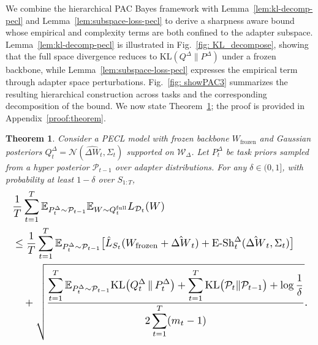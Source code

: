 \documentclass{article}
\theoremstyle{plain}
\newtheorem{theorem}{Theorem}[section]
\theoremstyle{definition}
\theoremstyle{remark}
\begin{document}



We combine the hierarchical PAC Bayes framework with Lemma~\ref{lem:kl-decomp-pecl} and Lemma~\ref{lem:subspace-loss-pecl} to derive a sharpness aware bound whose empirical and complexity terms are both confined to the adapter subspace.
Lemma~\ref{lem:kl-decomp-pecl} is illustrated in Fig.~\ref{fig: KL_decompose}, showing that the full space divergence reduces to $\mathrm{KL}(Q^{\Delta}\|P^{\Delta})$ under a frozen backbone, while Lemma~\ref{lem:subspace-loss-pecl} expresses the empirical term through adapter space perturbations.
Fig.~\ref{fig: showPAC3} summarizes the resulting hierarchical construction across tasks and the corresponding decomposition of the bound.
We now state Theorem~\ref{thm:pecl-bound}; the proof is provided in Appendix~\ref{proof:theorem}.


\begin{theorem}
\label{thm:pecl-bound}
Consider a PECL model with frozen backbone $W_{\mathrm{frozen}}$ and Gaussian posteriors 
$Q_t^\Delta = \mathcal N(\hat{\Delta W}_t,\Sigma_t)$ supported on $\mathcal W_\Delta$. 
Let $P_t^\Delta$ be task priors sampled from a hyper posterior $\mathcal P_{t-1}$ over adapter 
distributions. For any $\delta\in(0,1]$, with probability at least $1-\delta$ over $S_{1:T}$,
\begin{equation}
\label{eq:pecl-main-bound}
\resizebox{\linewidth}{!}{$
\begin{aligned}
&\frac{1}{T}\sum_{t=1}^T
\mathbb E_{P_t^\Delta\sim\mathcal P_{t-1}}
\mathbb E_{W\sim Q_t^{\mathrm{full}}}
L_{\mathcal D_t}(W) \\
&\le
\frac{1}{T}\sum_{t=1}^T
\mathbb E_{P_t^\Delta\sim\mathcal P_{t-1}}
\bigl[
\hat L_{S_t}(W_{\mathrm{frozen}} + \hat{\Delta W}_t)
+
\mathrm{E\text{-}Sh}_t^\Delta(\hat{\Delta W}_t,\Sigma_t)
\bigr] \\
&\quad+
\sqrt{
\frac{
\displaystyle
\sum_{t=1}^T
\mathbb E_{P_t^\Delta\sim\mathcal P_{t-1}}
\mathrm{KL}\bigl(Q_t^\Delta \,\Vert\, P_t^\Delta\bigr)
+
\sum_{t=1}^T
\mathrm{KL}\bigl(\mathcal P_t\Vert\mathcal P_{t-1}\bigr)
+
\log\frac{1}{\delta}}
{2\displaystyle\sum_{t=1}^T (m_t - 1)}
}.
\end{aligned}
$}
\end{equation}
\end{theorem}
\end{document}
